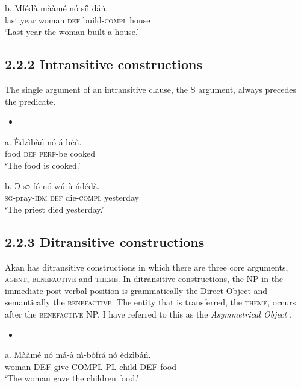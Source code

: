 \documentclass[output=paper]{langsci/langscibook}
\begin{document}
\gll  b.  \'{M}f\'{e}d\`{a}    m\`{a}\`{a}m\'{e}    n\'{o}  s\'{i}\`{i}    d\'{a}\'{n}.\\
       last.year  woman    \textsc{def}  build-\textsc{compl}  house\\
\glt   ‘Last year the woman built a house.’
\z

\subsection{2.2.2  Intransitive constructions}

The single argument of an intransitive clause, the S argument, always precedes the predicate. 

\begin{itemize}
\item \end{itemize}
\gll a.  \`{E}dz\`{i}b\`{a}\'{n}  n\'{o}  \'{a}-b\`{e}\`{n}.  \\
       food    \textsc{def}  \textsc{perf}{}-be cooked\\
\glt   ‘The food is cooked.’  
\z

\gll  b.  Ɔ{}-sɔ-f\'{o}      n\'{o}  w\'{u}-\`{u}    \'{n}d\'{e}d\`{a}.\\
       \textsc{sg}{}-pray-\textsc{idm}    \textsc{def}  die-\textsc{compl}  yesterday\\
\glt   ‘The priest died yesterday.’
\z

\subsection{2.2.3  Ditransitive constructions}

Akan has ditransitive constructions in which there are three core arguments, \textsc{agent, benefactive} and \textsc{theme}. In ditransitive constructions, the NP in the immediate post-verbal position is grammatically the Direct Object and semantically the \textsc{benefactive}. The entity that is transferred, the \textsc{theme}, occurs after the \textsc{benefactive} NP. I have referred to this as the \emph{Asymmetrical Object} \citep{Osam2000}.

\begin{itemize}
\item \end{itemize}
\gll a.  M\`{a}\`{a}m\'{e}    n\'{o}  m\'{a}-\`{a}    \`{m}-b\`{o}fr\'{a}  n\'{o}  \`{e}dz\`{i}b\'{a}\'{n}.\\
       woman    DEF  give-COMPL  PL-child  DEF  food\\
\glt   ‘The woman gave the children food.’
\z
\end{document}
